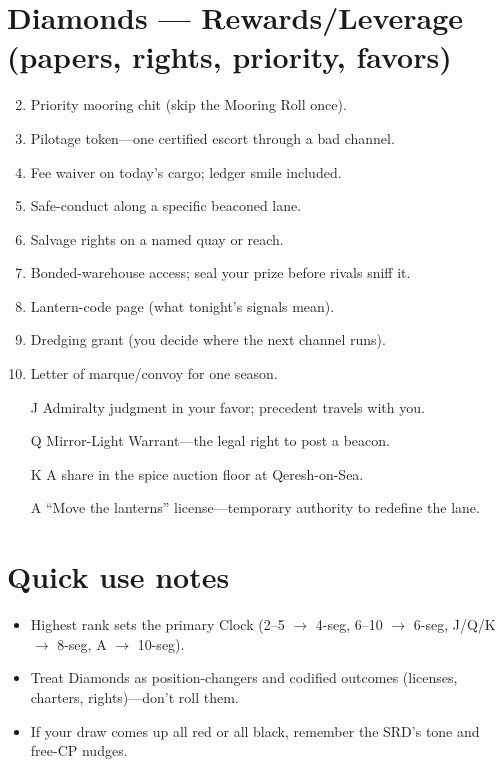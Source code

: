 \section*{Diamonds --- Rewards/Leverage (papers, rights, priority, favors)}
\begin{enumerate}
\setcounter{enumi}{1}
\item Priority mooring chit (skip the Mooring Roll once).
\item Pilotage token---one certified escort through a bad channel.
\item Fee waiver on today's cargo; ledger smile included.
\item Safe-conduct along a specific beaconed lane.
\item Salvage rights on a named quay or reach.
\item Bonded-warehouse access; seal your prize before rivals sniff it.
\item Lantern-code page (what tonight's signals mean).
\item Dredging grant (you decide where the next channel runs).
\item Letter of marque/convoy for one season.
\item[J] Admiralty judgment in your favor; precedent travels with you.
\item[Q] Mirror-Light Warrant---the legal right to post a beacon.
\item[K] A share in the spice auction floor at Qeresh-on-Sea.
\item[A] ``Move the lanterns'' license---temporary authority to redefine the lane.
\end{enumerate}

\section*{Quick use notes}
\begin{itemize}
\item Highest rank sets the primary Clock (2--5 $\rightarrow$ 4-seg, 6--10 $\rightarrow$ 6-seg, J/Q/K $\rightarrow$ 8-seg, A $\rightarrow$ 10-seg).
\item Treat Diamonds as position-changers and codified outcomes (licenses, charters, rights)---don't roll them.
\item If your draw comes up all red or all black, remember the SRD's tone and free-CP nudges.
\end{itemize}
